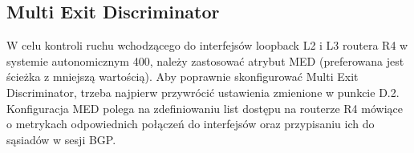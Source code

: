 \documentclass[a4paper,12pt,notitlepage]{article}
\begin{document}
\subsection{Multi Exit Discriminator}

W celu kontroli ruchu wchodzącego do interfejsów loopback L2 i L3 routera R4 w systemie autonomicznym 400, należy zastosować atrybut MED (preferowana jest ścieżka z mniejszą wartością). Aby poprawnie skonfigurować Multi Exit Discriminator, trzeba najpierw przywrócić ustawienia zmienione w punkcie D.2. Konfiguracja MED polega na zdefiniowaniu list dostępu na routerze R4 mówiące o metrykach odpowiednich połączeń do interfejsów oraz przypisaniu ich do sąsiadów w sesji BGP.
\end{document}
